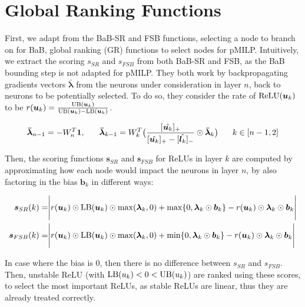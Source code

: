 \section{Global Ranking Functions}

\label{sec4p5}

First, we adapt from the BaB-SR \cite{BaB} and FSB \cite{FSB} functions, selecting a node to branch on for BaB, global ranking (GR) functions to select nodes for pMILP. Intuitively, we extract the scoring $s_{SR}$ and $s_{FSB}$ from both BaB-SR and FSB, as the BaB bounding step is not adapted for pMILP. They both work by backpropagating gradients vectors $\bm{\bar{\lambda}}$ from the neurons under consideration in layer $n$, back to neurons to be potentially selected. To do so, they consider the rate of $\mathrm{ReLU}(\bm{u}_k)$ to be $r(\bm{u}_k)=\frac{\mathrm{UB}(\bm{u}_k)}{\mathrm{UB}(\bm{u}_k)-\mathrm{LB}(\bm{u}_k)}$.

\begin{align*}
\bm{\bar{\lambda}}_{n-1} = -W^T_n\bm{1}, \hspace*{4ex}  	\bm{\bar{\lambda}}_{k-1} = W^T_k\big(\dfrac{[\hat{\bm{u}_k}]_+}{[\hat{\bm{u}_k}]_+-[\hat{\bm{l}_k}]_-}\odot\bm{\bar{\lambda}}_{k}\big) \hspace*{4ex}  k\in [n-1,2]
\end{align*}


Then, the scoring functions $\bm{s}_{SR}$ and $\bm{s}_{FSB}$ for ReLUs in layer $k$ are computed by approximating how each node would impact the neurons in layer $n$, by also factoring in the bias $\bm{b}_k$ in different ways:

\begin{align*}
	\bm{s}_{SR}(k) =& %
	\Biggl\lvert r(\bm{u}_k) \odot \LB(\bm{u}_k) \odot \max(\bm{\lambda}_{k},0)
	+ \max\{0,\bm{\lambda}_{k}\odot\bm{b}_{k}\}-r(\bm{u}_k) \odot\bm{\lambda}_{k}\odot\bm{{b}}_{k}
	\Biggr\rvert  \\
	\bm{s}_{FSB}(k) =& \Biggl\lvert r(\bm{u}_k) \odot \LB(\bm{u}_k) \odot \max(\bm{\lambda}_{k},0)
	+ \min\{0,\bm{\lambda}_{k}\odot\bm{b}_{k}\}-r(\bm{u}_k) \odot\bm{\lambda}_{k}\odot\bm{{b}}_{k}
	\Biggr\rvert
\end{align*}

In case where the bias is 0, then there is no difference between $s_{SR}$ and $s_{FSB}$.
Then, unstable ReLU (with $\mathrm{LB}(u_k) < 0 < \mathrm{UB}(u_k)$) are ranked using these scores, to select the most important ReLUs, as stable ReLUs are linear, thus they are already treated correctly.


